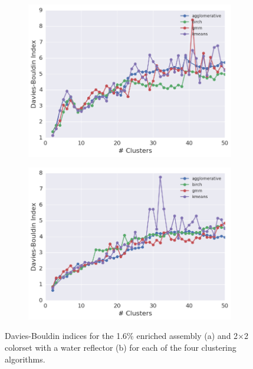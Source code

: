 \begin{figure}[h!]
\centering
\begin{subfigure}{\textwidth}
  \centering
  \includegraphics[width=0.9\linewidth]{figures/results/model-select/assm-16/db-combined-U238-capture-1}
  \caption{}
  \label{fig:chap11-assm-16-db-index}
\end{subfigure}
\begin{subfigure}{\textwidth}
  \centering
  \includegraphics[width=0.9\linewidth]{figures/results/model-select/reflector/db-combined-U238-nu-fission-1}
  \caption{}
\label{fig:chap11-refl-db-index}
\end{subfigure}
\caption[Davies-Bouldin indices]{Davies-Bouldin indices for the 1.6\% enriched assembly (a) and 2$\times$2 colorset with a water reflector (b) for each of the four clustering algorithms.}
\label{fig:chap11-db-indices}
\end{figure}

